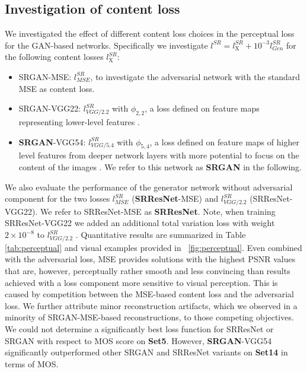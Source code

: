 \documentclass[10pt,twocolumn,letterpaper]{article}
\begin{document}
\subsection{Investigation of content loss}
We investigated the effect of different content loss choices in the perceptual loss for the \ac{GAN}-based networks. Specifically we investigate $l^{SR} = l^{SR}_\textrm{X} + 10^{-3}l^{SR}_{Gen}$ for the following content losses $l^{SR}_\textrm{X}$:\\
\begin{itemize}
\item SRGAN-MSE: $l^{SR}_{MSE}$, to investigate the adversarial network with the standard \ac{MSE} as content loss.
\item SRGAN-VGG22: $l^{SR}_{VGG/2.2}$ with $\phi_{2,2}$, a loss defined on feature maps representing lower-level features \cite{zeiler2014visualizing}.
\item \textbf{SRGAN}-VGG54: $l^{SR}_{VGG/5.4}$ with $\phi_{5,4}$, a loss defined on feature maps of higher level features from deeper network layers with more potential to focus on the content of the images \cite{zeiler2014visualizing,Yosinski2015,Mahendran2016}. We refer to this network as \textbf{SRGAN} in the following.
\end{itemize}
We also evaluate the performance of the generator network without adversarial component for the two losses $l^{SR}_{MSE}$ (\textbf{SRResNet}-MSE) and $l^{SR}_{VGG/2.2}$ (SRResNet-VGG22). We refer to SRResNet-MSE as \textbf{SRResNet}.
Note, when training SRResNet-VGG22 we added an additional total variation loss with weight $2\times10^{-8}$ to $l^{SR}_{VGG/2.2}$ \cite{Aly2005,Johnson16PercepLoss}.
Quantitative results are summarized in Table \ref{tab:perceptual} and visual examples provided in \figurename~\ref{fig:perceptual}.
Even combined with the adversarial loss, \ac{MSE} provides solutions with the highest \ac{PSNR} values that are, however, perceptually rather smooth and less convincing than results achieved with a loss component more sensitive to visual perception. This is caused by competition between the \ac{MSE}-based content loss and the adversarial loss. We further attribute minor reconstruction artifacts, which we observed in a minority of SRGAN-MSE-based reconstructions, to those competing objectives. We could not determine a significantly best loss function for SRResNet or SRGAN with respect to \ac{MOS} score on \textbf{Set5}. However, \textbf{SRGAN}-VGG54 significantly outperformed other SRGAN and SRResNet variants on \textbf{Set14} in terms of \ac{MOS}.
\end{document}
